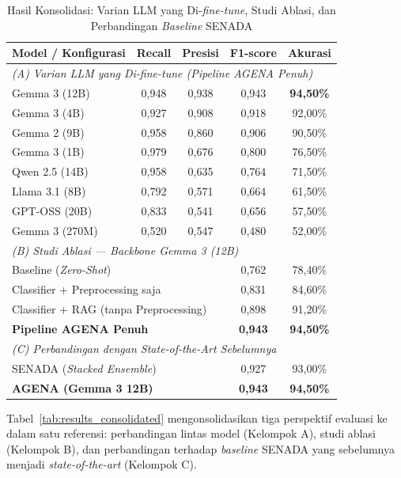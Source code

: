 \documentclass{ieeeaccess}
\begin{document}
\begin{table}[t]
\caption{Hasil Konsolidasi: Varian LLM yang Di-\textit{fine-tune}, Studi Ablasi, dan Perbandingan \textit{Baseline} SENADA}
\begin{center}
\begin{tabular}{|l|c|c|c|c|}
\hline
\textbf{Model / Konfigurasi} & \textbf{Recall} & \textbf{Presisi} & \textbf{F1-score} & \textbf{Akurasi} \\
\hline
\multicolumn{5}{|l|}{\textit{(A) Varian LLM yang Di-fine-tune (Pipeline AGENA Penuh)}} \\
\hline
Gemma 3 (12B) & 0,948 & 0,938 & 0,943 & \textbf{94,50\%} \\
Gemma 3 (4B) & 0,927 & 0,908 & 0,918 & 92,00\% \\
Gemma 2 (9B) & 0,958 & 0,860 & 0,906 & 90,50\% \\
Gemma 3 (1B) & 0,979 & 0,676 & 0,800 & 76,50\% \\
Qwen 2.5 (14B) & 0,958 & 0,635 & 0,764 & 71,50\% \\
Llama 3.1 (8B) & 0,792 & 0,571 & 0,664 & 61,50\% \\
GPT-OSS (20B) & 0,833 & 0,541 & 0,656 & 57,50\% \\
Gemma 3 (270M) & 0,520 & 0,547 & 0,480 & 52,00\% \\
\hline
\multicolumn{5}{|l|}{\textit{(B) Studi Ablasi --- Backbone Gemma 3 (12B)}} \\
\hline
\multicolumn{3}{|l|}{Baseline (\textit{Zero-Shot})} & 0,762 & 78,40\% \\
\multicolumn{3}{|l|}{Classifier + Preprocessing saja} & 0,831 & 84,60\% \\
\multicolumn{3}{|l|}{Classifier + RAG (tanpa Preprocessing)} & 0,898 & 91,20\% \\
\multicolumn{3}{|l|}{\textbf{Pipeline AGENA Penuh}} & \textbf{0,943} & \textbf{94,50\%} \\
\hline
\multicolumn{5}{|l|}{\textit{(C) Perbandingan dengan \textit{State-of-the-Art} Sebelumnya}} \\
\hline
\multicolumn{3}{|l|}{SENADA \cite{b19} (\textit{Stacked Ensemble})} & 0,927 & 93,00\% \\
\multicolumn{3}{|l|}{\textbf{AGENA (Gemma 3 12B)}} & \textbf{0,943} & \textbf{94,50\%} \\
\hline
\end{tabular}
\end{center}
\end{table}

Tabel~\ref{tab:results_consolidated} mengonsolidasikan tiga perspektif evaluasi ke dalam satu referensi: perbandingan lintas model (Kelompok A), studi ablasi (Kelompok B), dan perbandingan terhadap \textit{baseline} SENADA yang sebelumnya menjadi \textit{state-of-the-art} (Kelompok C).
\end{document}
